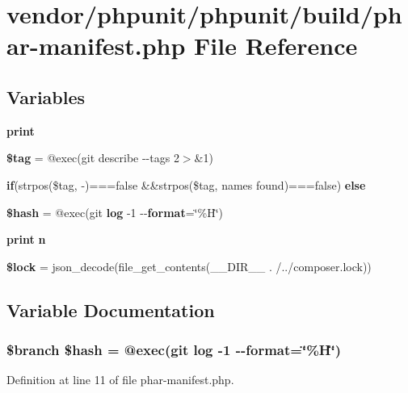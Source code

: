\section{vendor/phpunit/phpunit/build/phar-\/manifest.php File Reference}
\label{phar-manifest_8php}
\subsection*{Variables}
\begin{DoxyCompactItemize}
\item 
{\bf print}
\item 
{\bf \$tag} = @exec(\textquotesingle{}git describe -\/-\/tags 2$>$\&1\textquotesingle{})
\item 
{\bf if}(strpos(\$tag, \textquotesingle{}-\/\textquotesingle{})===false \&\&strpos(\$tag,  names found\textquotesingle{})===false) {\bf else}
\item 
{\bf \$hash} = @exec(\textquotesingle{}git {\bf log} -\/1 -\/-\/{\bf format}=\char`\"{}\%H\char`\"{}\textquotesingle{})
\item 
{\bf print} {\bf n}
\item 
{\bf \$lock} = json\+\_\+decode(file\+\_\+get\+\_\+contents(\+\_\+\+\_\+\+D\+I\+R\+\_\+\+\_\+ . \textquotesingle{}/../composer.\+lock\textquotesingle{}))
\end{DoxyCompactItemize}


\subsection{Variable Documentation}
\subsubsection[{\$hash}]{ \$branch \$hash = @exec(\textquotesingle{}git {\bf log} -\/1 -\/-\/{\bf format}=\char`\"{}\%H\char`\"{}\textquotesingle{})}\label{phar-manifest_8php_ae4ca548bcfadc871a64eb7e8d03330e6}


Definition at line 11 of file phar-\/manifest.\+php.

